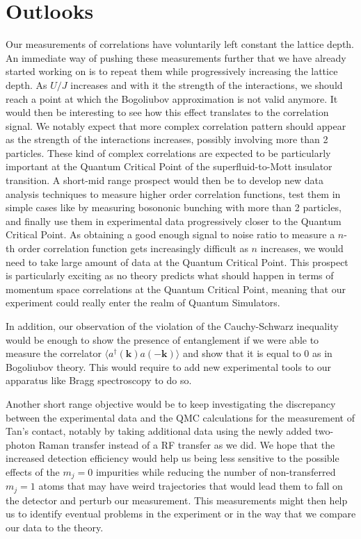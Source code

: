 \section*{Outlooks}


Our measurements of \kmk correlations have voluntarily left constant the lattice depth. An immediate way of pushing these measurements further that we have already started working on is to repeat them while progressively increasing the lattice depth. As $U/J$ increases and with it the strength of the interactions, we should reach a point at which the Bogoliubov approximation is not valid anymore. It would then be interesting to see how this effect translates to the \kmk correlation signal. We notably expect that more complex correlation pattern should appear as the strength of the interactions increases, possibly involving more than 2 particles. These kind of complex correlations are expected to be particularly important at the Quantum Critical Point of the superfluid-to-Mott insulator transition. A short-mid range prospect would then be to develop new data analysis techniques to measure higher order correlation functions, test them in simple cases like by measuring bosononic bunching with more than 2 particles, and finally use them in experimental data progressively closer to the Quantum Critical Point. As obtaining a good enough signal to noise ratio to measure a $n$-th order correlation function gets increasingly difficult as $n$ increases, we would need to take large amount of data at the Quantum Critical Point. This prospect is particularly exciting as no theory predicts what should happen in terms of momentum space correlations at the Quantum Critical Point, meaning that our experiment could really enter the realm of Quantum Simulators. 

In addition, our observation of the violation of the Cauchy-Schwarz inequality would be enough to show the presence of entanglement if we were able to measure the correlator  $\langle a^{\dagger}({\bm k}) a({-\bm k}) \rangle$ and show that it is equal to 0 as in Bogoliubov theory. This would require to add new experimental tools to our apparatus like Bragg spectroscopy to do so.

Another short range objective would be to keep investigating the discrepancy between the experimental data and the QMC calculations for the measurement of Tan's contact, notably by taking additional data using the newly added two-photon Raman transfer instead of a RF transfer as we did. We hope that the increased detection efficiency would help us being less sensitive to the possible effects of the $m_j=0$ impurities while reducing the number of non-transferred $m_j=1$ atoms that may have weird trajectories that would lead them to fall on the detector and perturb our measurement. This measurements might then help us to identify eventual problems in the experiment or in the way that we compare our data to the theory.

